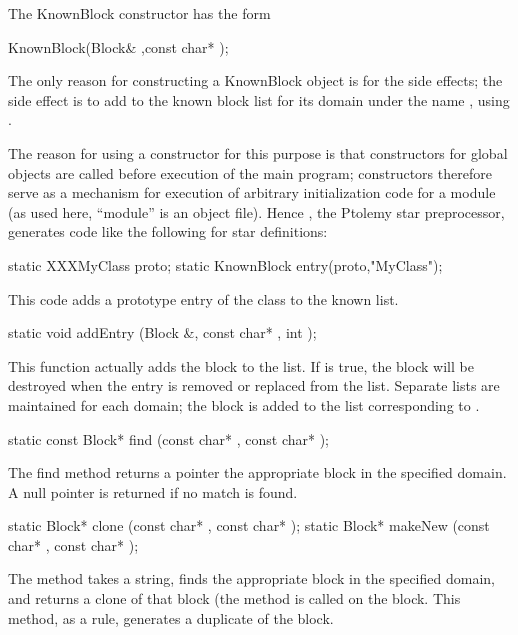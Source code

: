 The KnownBlock constructor has the form

\begin{example}
KnownBlock(Block& ,const char* );
\end{example}

The only reason for constructing a KnownBlock object is for the side
effects; the side effect is to add  to the known block list
for its domain under the name , using .

The reason for using a constructor for this purpose is that constructors
for global objects are called before execution of the main program;
constructors therefore serve as a mechanism for execution of arbitrary
initialization code for a module (as used here, ``module'' is an object
file).  Hence , the Ptolemy star preprocessor, generates
code like the following for star definitions:

\begin{example}
static XXXMyClass proto;
static KnownBlock entry(proto,"MyClass");
\end{example}

This code adds a prototype entry of the class to the known list.

\begin{example}
static void addEntry (Block &, const char* , int );
\end{example}

This function actually adds the block to the list.  If  is true,
the block will be destroyed when the entry is removed or replaced from
the list.  Separate lists are maintained for each domain; the block
is added to the list corresponding to .

\begin{example}
static const Block* find (const char* , const char* );
\end{example}

The find method returns a pointer the appropriate block in
the specified domain.  A null pointer is returned if no match
is found.

\begin{example}
static Block* clone (const char* , const char* );
static Block* makeNew (const char* , const char* );
\end{example}

The  method takes a string, finds the appropriate block in
the specified domain, and returns a clone of that block (the
 method is called on the block.  This method, as
a rule, generates a duplicate of the block.

